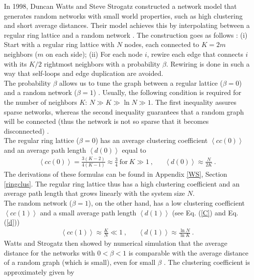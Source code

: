 \documentclass[11 pt , letterpaper , twoside , openright]{book}
\begin{document}
In 1998, Duncan Watts and Steve Strogatz constructed a network model that generates random networks with small world properties, such as high clustering and short average distances. Their model achieves this by interpolating between a regular ring lattice and a random network \cite{Watts1998}. The construction goes as follows \cite{Watts1998}: (i) Start with a regular ring lattice with $N$ nodes, each connected to $K = 2m$ neighbors ($m$ on each side); (ii) For each node $i$, rewire each edge that connects $i$ with its $K/2$ rightmost neighbors with a probability $\beta$. Rewiring is done in such a way that self-loops and edge duplication are avoided.\\
\newline
The probability $\beta$ allows us to tune the graph between a regular lattice ($\beta = 0$) and a random network ($\beta = 1$) \cite{Watts1998}. Usually, the following condition is required for the number of neighbors $K$: $N \gg K \gg \ln{N} \gg 1$. The first inequality assures sparse networks, whereas the second inequality guarantees that a random graph will be connected (thus the network is not so sparse that it becomes disconnected) \cite{Watts1998}.\\
\newline
The regular ring lattice ($\beta=0$) has an average clustering coefficient $\left<cc(0)\right>$ and an average path length $\left<d(0)\right>$ equal to \cite{Watts1998}
\begin{align}\label{C0}
	\left<cc(0)\right> = \frac{3(K-2)}{4(K-1)} \approx \frac{3}{4} \ \text{for}\ K \gg 1 \ , && \left<d(0)\right> \approx \frac{N}{2K} \ .
\end{align}
The derivations of these formulas can be found in Appendix \ref{WS}, Section \ref{ringclus}. The regular ring lattice thus has a high clustering coefficient and an average path length that grows linearly with the system size $N$. \\
\newline
The random network ($\beta = 1$), on the other hand, has a low clustering coefficient $\left<cc(1)\right>$ and a small average path length $\left<d(1)\right>$ (see Eq. (\ref{C}) and Eq. (\ref{d})) \cite{Watts1998}
\begin{align}
	\left<cc(1)\right> \approx \frac{K}{N} \ll 1 \ , && \left<d(1)\right> \approx \frac{\ln{N}}{\ln{K}} \ .
\end{align}
Watts and Strogatz then showed by numerical simulation that the average distance for the networks with $0 < \beta < 1$ is comparable with the average distance of a random graph (which is small), even for small $\beta$ \cite{Newman2000}. The clustering coefficient is approximately given by   \cite{Barrat1999}
\end{document}
